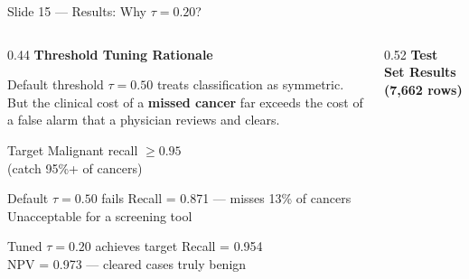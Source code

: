 \documentclass[aspectratio=169, 9pt]{beamer}
\begin{document}
\begin{frame}{Slide 15 --- Results: Why $\tau = 0.20$?}

  \begin{columns}[T]

    \begin{column}{0.44\textwidth}
      \textbf{\color{navyblue}Threshold Tuning Rationale}

      \vspace{0.4em}
      \small
      Default threshold $\tau = 0.50$ treats classification as symmetric.
      But the clinical cost of a \textbf{missed cancer} far exceeds the cost
      of a false alarm that a physician reviews and clears.

      \vspace{0.5em}
      \begin{block}{Target}
        \small Malignant recall $\geq 0.95$\\
        (catch 95\%+ of cancers)
      \end{block}

      \vspace{0.4em}
      \begin{alertblock}{Default $\tau = 0.50$ fails}
        \small Recall = 0.871 --- misses 13\% of cancers \\
        Unacceptable for a screening tool
      \end{alertblock}

      \vspace{0.4em}
      \begin{exampleblock}{Tuned $\tau = 0.20$ achieves target}
        \small Recall = 0.954 \checkmark \\
        NPV = 0.973 --- cleared cases truly benign
      \end{exampleblock}
    \end{column}

    \begin{column}{0.52\textwidth}
      \textbf{\color{navyblue}Test Set Results (7,662 rows)}


\end{column}
\end{columns}
\end{frame}
\end{document}
